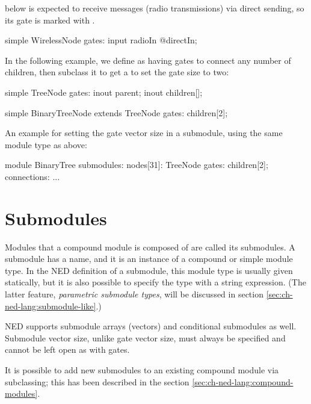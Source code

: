  below is expected to receive messages (radio transmissions)
via direct sending, so its  gate is marked with .

\begin{ned}
simple WirelessNode {
    gates:
        input radioIn @directIn;
}
\end{ned}

In the following example, we define  as having gates to connect
any number of children, then subclass it to get a  to
set the gate size to two:

\begin{ned}
simple TreeNode {
    gates:
        inout parent;
        inout children[];
}

simple BinaryTreeNode extends TreeNode {
    gates:
        children[2];
}
\end{ned}

An example for setting the gate vector size in a submodule, using the same
 module type as above:

\begin{ned}
module BinaryTree {
    submodules:
        nodes[31]: TreeNode {
            gates:
                children[2];
        }
    connections:
        ...
}
\end{ned}



\section{Submodules}
\label{sec:ch-ned-lang:submodules}

Modules that a compound module is composed of are called its submodules.
A submodule has a name, and it is an instance of a compound or simple
module type. In the NED definition of a submodule, this module type
is usually given statically, but it is also possible to specify the type
with a string expression. (The latter feature, \textit{parametric submodule
types}, will be discussed in section \ref{sec:ch-ned-lang:submodule-like}.)

NED supports submodule arrays (vectors) and conditional submodules as well.
Submodule vector size, unlike gate vector size, must always be specified
and cannot be left open as with gates.

It is possible to add new submodules to an existing compound module via
subclassing; this has been described in the section
\ref{sec:ch-ned-lang:compound-modules}.

